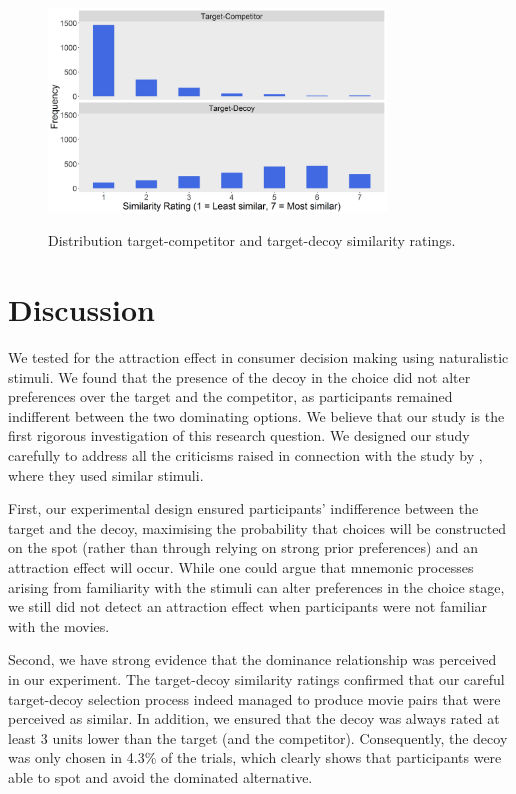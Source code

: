 \documentclass[12pt, a4paper]{article}
\begin{document}
\begin{figure}[htb!]
\centering
\captionsetup{justification=centering}
\caption{Distribution target-competitor and target-decoy similarity ratings.}
\includegraphics[width=0.8\textwidth]{exp2_similarityratings.png}
\label{fig:exp2_similarityratings}
\end{figure}

\section{Discussion}

We tested for the attraction effect in consumer decision making using naturalistic stimuli. We found that the presence of the decoy in the choice did not alter preferences over the target and the competitor, as participants remained indifferent between the two dominating options. We believe that our study is the first rigorous investigation of this research question. We designed our study carefully to address all the criticisms raised in connection with the study by \citeauthor{Frederick2014}, where they used similar stimuli.

First, our experimental design ensured participants' indifference between the target and the decoy, maximising the probability that choices will be constructed on the spot (rather than through relying on strong prior preferences) and an attraction effect will occur. While one could argue that mnemonic processes arising from familiarity with the stimuli can alter preferences in the choice stage, we still did not detect an attraction effect when participants were not familiar with the movies. 

Second, we have strong evidence that the dominance relationship was perceived in our experiment. The target-decoy similarity ratings confirmed that our careful target-decoy selection process indeed managed to produce movie pairs that were perceived as similar. In addition, we ensured that the decoy was always rated at least 3 units lower than the target (and the competitor). Consequently, the decoy was only chosen in 4.3\% of the trials, which clearly shows that participants were able to spot and avoid the dominated alternative.
\end{document}
